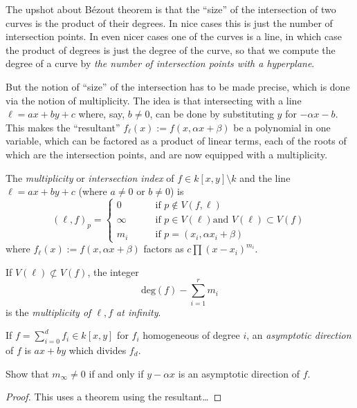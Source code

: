 \documentclass{book}
\begin{document}
\medskip\noindent
The upshot about Bézout theorem is that the
``size'' of the intersection
of two curves is the product of their
degrees.
In nice cases this is just the number of
intersection points.
In even nicer cases one of the curves is a
line,
in which case the product of degrees is
just the degree of the curve,
so that we compute the degree of a curve by
{\it the number of intersection points with a
hyperplane}.

But the notion of ``size'' of the
intersection
has to be made precise, which is done via the
notion of multiplicity.
The idea is that intersecting with a line
$\ell=ax +by+c$ where, say,  $b \neq 0$,
can be done by substituting $y$
for $-\alpha x-b$.
This makes the ``resultant''
$f_\ell(x):=f(x,\alpha x+\beta)$
be a polynomial in one variable,
which can be factored as a product of linear
terms, each of the roots of which
are the intersection points,
and are now equipped with a multiplicity.

\begin{definition}
\label{definition-multiplicity-line}
The {\it multiplicity} or {\it intersection
index}
of $f\in k[x,y]\setminus k$ and
the line $\ell=ax+by+c$ (where $a \neq 0$ or
$b\neq 0$) is
$$
(\ell,f)_p =
\begin{cases}
0\qquad &\text{if }p \not\in V(f,\ell) \\
\infty \qquad &\text{if }p \in V(\ell) \text{
and }V(\ell) \subset V(f)\\
m_i \qquad & \text{if }p=(x_i,\alpha
x_i+\beta)
\end{cases}
$$
where $f_\ell(x):=f(x,\alpha x+\beta)$
factors as $c\prod(x-x_i)^{m_i}$.

If $V(\ell)\not \subset V(f)$, the integer
$$
\text{deg}(f)-\sum_{i=1}^rm_i
$$
is the {\it multiplicity of $\ell,f$ at
infinity}.
\end{definition}

\begin{exercise}
\label{exercise-asymptotic-direction}
If $f=\sum_{i=0}^df_i \in k[x,y]$ for $f_i$
homogeneous of degree $i$,
an {\it asymptotic direction} of $f$ is
$ax+by$
which divides $f_d$.

Show that  $m_\infty \neq 0$ if and only if
$y-\alpha x$
is an asymptotic direction of $f$.
\end{exercise}

\begin{proof}
This uses a theorem using the resultant…
\end{proof}
\end{document}
